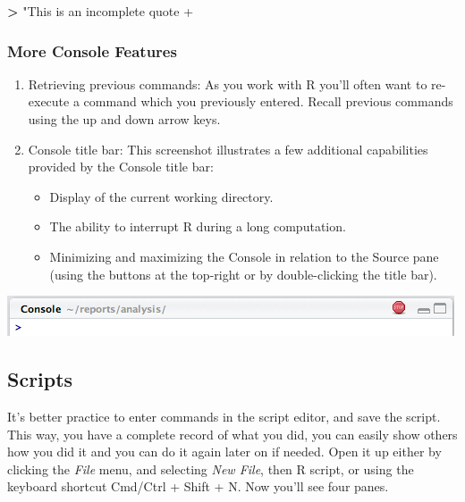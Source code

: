 \documentclass[]{book}
\newenvironment{Shaded}{\begin{snugshade}}{\end{snugshade}}
\newcommand{\OperatorTok}[1]{\textcolor[rgb]{0.81,0.36,0.00}{\textbf{#1}}}
\newcommand{\StringTok}[1]{\textcolor[rgb]{0.31,0.60,0.02}{#1}}
\providecommand{\tightlist}{%
  \setlength{\itemsep}{0pt}\setlength{\parskip}{0pt}}
\begin{document}
\begin{Shaded}
\begin{Highlighting}[]
\OperatorTok{>}\StringTok{ "This is an incomplete quote}
\StringTok{+}
\end{Highlighting}
\end{Shaded}

\hypertarget{more-console-features}{%
\subsubsection*{More Console Features}\label{more-console-features}}

\begin{enumerate}
\def\labelenumi{\arabic{enumi}.}
\item
  Retrieving previous commands: As you work with R you'll often want to re-execute a command which you previously entered. Recall previous commands using the up and down arrow keys.
\item
  Console title bar: This screenshot illustrates a few additional capabilities provided by the Console title bar:

  \begin{itemize}
  \tightlist
  \item
    Display of the current working directory.
  \item
    The ability to interrupt R during a long computation.
  \item
    Minimizing and maximizing the Console in relation to the Source pane (using the buttons at the top-right or by double-clicking the title bar).
  \end{itemize}
\end{enumerate}

\begin{center}\includegraphics[width=0.7\linewidth]{img/using_console_title_bar} \end{center}

\hypertarget{scripts}{%
\subsection{Scripts}\label{scripts}}

It's better practice to enter commands in the script editor, and save the script. This way, you have a complete record of what you did, you can easily show others how you did it and you can do it again later on if needed. Open it up either by clicking the \emph{File} menu, and selecting \emph{New File}, then R script, or using the keyboard shortcut Cmd/Ctrl + Shift + N. Now you'll see four panes.
\end{document}
